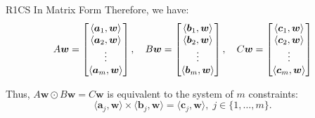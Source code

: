\documentclass{zkdl-presentation-template}
\begin{document}
\begin{frame}{R1CS In Matrix Form}
        Therefore, we have:
        \vspace{-5pt}
        {\scriptsize \begin{equation*}
            A\boldsymbol{w} = \begin{bmatrix}
                \langle \boldsymbol{a}_1, \boldsymbol{w}\rangle \\
                \langle \boldsymbol{a}_2, \boldsymbol{w}\rangle \\
                \vdots \\
                \langle \boldsymbol{a}_m, \boldsymbol{w}\rangle 
            \end{bmatrix}, \quad
            B\boldsymbol{w} = \begin{bmatrix}
                \langle \boldsymbol{b}_1, \boldsymbol{w}\rangle \\
                \langle \boldsymbol{b}_2, \boldsymbol{w}\rangle \\
                \vdots \\
                \langle \boldsymbol{b}_m, \boldsymbol{w}\rangle 
            \end{bmatrix}, \quad
            C\boldsymbol{w} = \begin{bmatrix}
                \langle \boldsymbol{c}_1, \boldsymbol{w}\rangle \\
                \langle \boldsymbol{c}_2, \boldsymbol{w}\rangle \\
                \vdots \\
                \langle \boldsymbol{c}_m, \boldsymbol{w}\rangle 
            \end{bmatrix}
            \vspace{-5pt}
        \end{equation*}}
        
        Thus, {\small $A\boldsymbol{w} \odot B\boldsymbol{w} = C\boldsymbol{w}$} is equivalent to the system of $m$ constraints:
        \vspace{-5pt}
        {\small \begin{equation*}
            \langle \boldsymbol{a}_j, \boldsymbol{w}\rangle \times \langle \boldsymbol{b}_j, \boldsymbol{w} \rangle = \langle \boldsymbol{c}_j, \boldsymbol{w} \rangle, \; j \in \{1,\dots,m\}.
        \end{equation*}}
    \end{frame}
\end{document}
